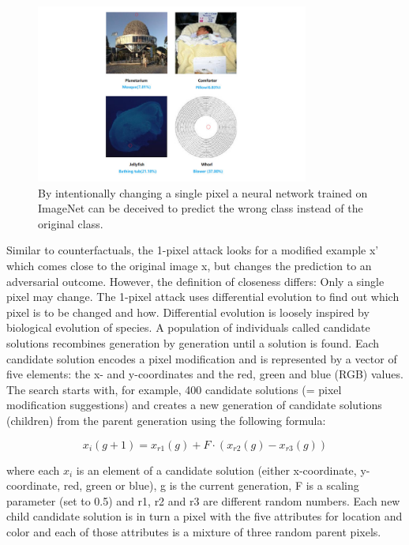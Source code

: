 \documentclass[
  10pt,
]{scrbook}
\begin{document}
\begin{figure}

{\centering \includegraphics[width=0.8\textwidth]{images/adversarial-1pixel} 

}

\caption{By intentionally changing a single pixel a neural network trained on ImageNet can be deceived to predict the wrong class instead of the original class.}\label{fig:adversarial-1pixel}
\end{figure}

Similar to counterfactuals, the 1-pixel attack looks for a modified example x' which comes close to the original image x, but changes the prediction to an adversarial outcome.
However, the definition of closeness differs: Only a single pixel may change.
The 1-pixel attack uses differential evolution to find out which pixel is to be changed and how.
Differential evolution is loosely inspired by biological evolution of species.
A population of individuals called candidate solutions recombines generation by generation until a solution is found.
Each candidate solution encodes a pixel modification and is represented by a vector of five elements: the x- and y-coordinates and the red, green and blue (RGB) values.
The search starts with, for example, 400 candidate solutions (= pixel modification suggestions) and creates a new generation of candidate solutions (children) from the parent generation using the following formula:

\[x_{i}(g+1)=x_{r1}(g)+F\cdot(x_{r2}(g)-x_{r3}(g))\]

where each \(x_i\) is an element of a candidate solution (either x-coordinate, y-coordinate, red, green or blue), g is the current generation, F is a scaling parameter (set to 0.5) and r1, r2 and r3 are different random numbers.
Each new child candidate solution is in turn a pixel with the five attributes for location and color and each of those attributes is a mixture of three random parent pixels.
\end{document}
